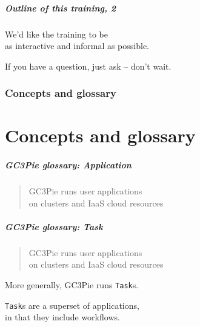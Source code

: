\documentclass[english,serif,mathserif,usenames,dvipsnames]{beamer}
\begin{document}
\begin{frame}
  \frametitle{Outline of this training, 2}
  \begin{center}
    We'd like the training to be \\ as interactive and informal as possible.

    \+ If you have a question, just ask -- don't wait.
  \end{center}
\end{frame}


\section{Concepts and glossary}
\part{Concepts and glossary}


\begin{frame}
  \frametitle{GC3Pie glossary: Application}
  \begin{quote}
    GC3Pie runs \alert<2-3>{user applications}
    \\
    on clusters and IaaS cloud resources
  \end{quote}

\end{frame}



\begin{frame}
  \frametitle{GC3Pie glossary: Task}
  \begin{quote}
    GC3Pie \alert{runs} user applications
    \\
    on clusters and IaaS cloud resources
  \end{quote}

  \+ More generally, GC3Pie runs \texttt{Task}s.

  \+ \texttt{Task}s are a superset of applications,
  \\ in that they include workflows.

  \+ \hyperlink{workflows}{}
\end{frame}
\end{document}
